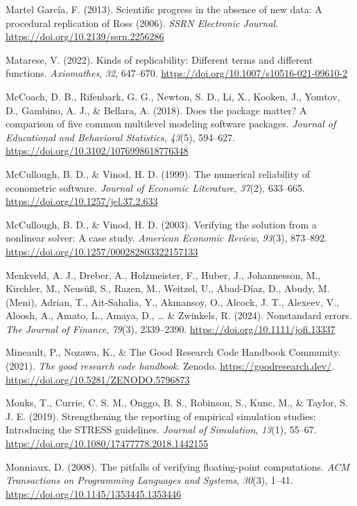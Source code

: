 \documentclass[authordate, meta]{jote-new-article}
\begin{document}
	Martel García, F. (2013). Scientific progress in the absence of new data: A procedural replication of Ross (2006). \emph{SSRN Electronic Journal}. \url{https://doi.org/10.2139/ssrn.2256286}


	Matarese, V. (2022). Kinds of replicability: Different terms and different functions. \emph{Axiomathes}, \emph{32}, 647--670. \url{https://doi.org/10.1007/s10516-021-09610-2}


	McCoach, D. B., Rifenbark, G. G., Newton, S. D., Li, X., Kooken, J., Yomtov, D., Gambino, A. J., \& Bellara, A. (2018). Does the package matter? A comparison of five common multilevel modeling software packages. \emph{Journal of Educational and Behavioral Statistics}, \emph{43}(5), 594--627. \url{https://doi.org/10.3102/1076998618776348}


	McCullough, B. D., \& Vinod, H. D. (1999). The numerical reliability of econometric software. \emph{Journal of Economic Literature}, \emph{37}(2), 633--665. \url{https://doi.org/10.1257/jel.37.2.633}


	McCullough, B. D., \& Vinod, H. D. (2003). Verifying the solution from a nonlinear solver: A case study. \emph{American Economic Review}, \emph{93}(3), 873--892. \url{https://doi.org/10.1257/000282803322157133}


	Menkveld, A. J., Dreber, A., Holzmeister, F., Huber, J., Johannesson, M., Kirchler, M., Neusüß, S., Razen, M., Weitzel, U., Abad-Díaz, D., Abudy, M. (Meni), Adrian, T., Ait-Sahalia, Y., Akmansoy, O., Alcock, J. T., Alexeev, V., Aloosh, A., Amato, L., Amaya, D., … \& Zwinkels, R. (2024). Nonstandard errors. \emph{The Journal of Finance}, \emph{79}(3), 2339--2390. \url{https://doi.org/10.1111/jofi.13337}


	Mineault, P., Nozawa, K., \& The Good Research Code Handbook Community. (2021). \emph{The good research code handbook}. Zenodo. \url{https://goodresearch.dev/}. \url{https://doi.org/10.5281/ZENODO.5796873}


	Monks, T., Currie, C. S. M., Onggo, B. S., Robinson, S., Kunc, M., \& Taylor, S. J. E. (2019). Strengthening the reporting of empirical simulation studies: Introducing the STRESS guidelines. \emph{Journal of Simulation}, \emph{13}(1), 55--67. \url{https://doi.org/10.1080/17477778.2018.1442155}


	Monniaux, D. (2008). The pitfalls of verifying floating-point computations. \emph{ACM Transactions on Programming Languages and Systems}, \emph{30}(3), 1--41. \url{https://doi.org/10.1145/1353445.1353446}
\end{document}
